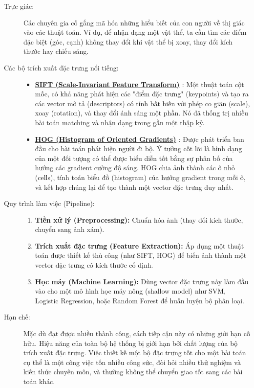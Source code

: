 \begin{description}
    \item[Trực giác:] Các chuyên gia cố gắng mã hóa những hiểu biết của con người về thị giác vào các thuật toán. Ví dụ, để nhận dạng một vật thể, ta cần tìm các điểm đặc biệt (góc, cạnh) không thay đổi khi vật thể bị xoay, thay đổi kích thước hay chiếu sáng.
    \item[Các bộ trích xuất đặc trưng nổi tiếng:]
    \begin{itemize}
    	\item \textbf{\hyperref[subsec:sift]{SIFT (Scale-Invariant Feature Transform)} \cite{Lowe2004}}: Một thuật toán cột mốc, có khả năng phát hiện các "điểm đặc trưng" (keypoints) và tạo ra các vector mô tả (descriptors) có tính bất biến với phép co giãn (scale), xoay (rotation), và thay đổi ánh sáng một phần. Nó đã thống trị nhiều bài toán matching và nhận dạng trong gần một thập kỷ.
    	
    	\item \textbf{\hyperref[subsec:hog]{HOG (Histogram of Oriented Gradients)} \cite{Dalal2005}}: Được phát triển ban đầu cho bài toán phát hiện người đi bộ. Ý tưởng cốt lõi là hình dạng của một đối tượng có thể được biểu diễn tốt bằng sự phân bố của hướng các gradient cường độ sáng. HOG chia ảnh thành các ô nhỏ (cells), tính toán biểu đồ (histogram) của hướng gradient trong mỗi ô, và kết hợp chúng lại để tạo thành một vector đặc trưng duy nhất.
    \end{itemize}
   
    \item[Quy trình làm việc (Pipeline):]
    \begin{enumerate}
        \item \textbf{Tiền xử lý (Preprocessing):} Chuẩn hóa ảnh (thay đổi kích thước, chuyển sang ảnh xám).
        \item \textbf{Trích xuất đặc trưng (Feature Extraction):} Áp dụng một thuật toán được thiết kế thủ công (như SIFT, HOG) để biến ảnh thành một vector đặc trưng có kích thước cố định.
        \item \textbf{Học máy (Machine Learning):} Dùng vector đặc trưng này làm đầu vào cho một mô hình học máy nông (shallow model) như SVM, Logistic Regression, hoặc Random Forest để huấn luyện bộ phân loại.
    \end{enumerate}
    \item[Hạn chế:] Mặc dù đạt được nhiều thành công, cách tiếp cận này có những giới hạn cố hữu. Hiệu năng của toàn bộ hệ thống bị giới hạn bởi chất lượng của bộ trích xuất đặc trưng. Việc thiết kế một bộ đặc trưng tốt cho một bài toán cụ thể là một công việc tốn nhiều công sức, đòi hỏi nhiều thử nghiệm và kiến thức chuyên môn, và thường không thể chuyển giao tốt sang các bài toán khác.
\end{description}

